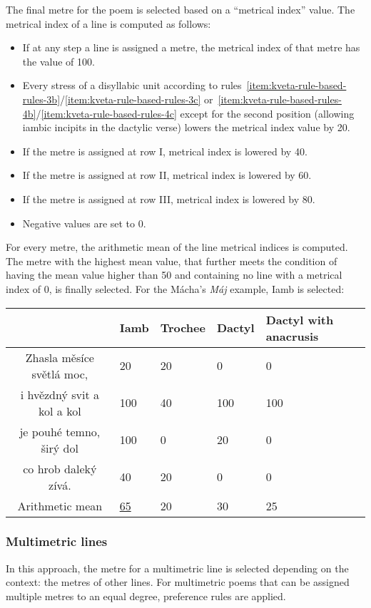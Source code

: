 The final metre for the poem is selected based on a \enquote{metrical index} value. The metrical index of a line is computed as follows:
\begin{itemize}
    \item If at any step a line is assigned a metre, the metrical index of that metre has the value of 100.
    \item Every stress of a disyllabic unit according to rules~\ref{item:kveta-rule-based-rules-3b}/\ref{item:kveta-rule-based-rules-3c} or~\ref{item:kveta-rule-based-rules-4b}/\ref{item:kveta-rule-based-rules-4c} except for
the second position (allowing iambic incipits in the dactylic verse) lowers the metrical index value by 20.
    \item If the metre is assigned at row I, metrical index is lowered by 40.
    \item If the metre is assigned at row II, metrical index is lowered by 60.
    \item If the metre is assigned at row III, metrical index is lowered by 80.
    \item Negative values are set to 0.
 \end{itemize}

For every metre, the arithmetic mean of the line metrical indices is computed. The metre with the highest mean value, that further meets the condition of having the mean value higher than 50 and containing no line with a metrical index of 0, is finally selected. For the Mácha's \emph{Máj} example, Iamb is selected:

\begin{center}
\begin{tabular}{c||l|l|l|l}
    & Iamb & Trochee & Dactyl & Dactyl with anacrusis\\\hline\hline
    Zhasla měsíce světlá moc, & 20 & 20 & 0 & 0\\
    i hvězdný svit a kol a kol & 100 & 40 & 100 & 100\\
    je pouhé temno, širý dol & 100 & 0 & 20 & 0\\
    co hrob daleký zívá. & 40 & 20 & 0 & 0\\\hline\hline
    Arithmetic mean & \underline{65} & 20 & 30 & 25\\
\end{tabular}
\end{center}

\subsubsection{Multimetric lines}
In this approach, the metre for a multimetric line is selected depending on the context: the metres of other lines. For multimetric poems that can be assigned multiple metres to an equal degree, preference rules are applied.

